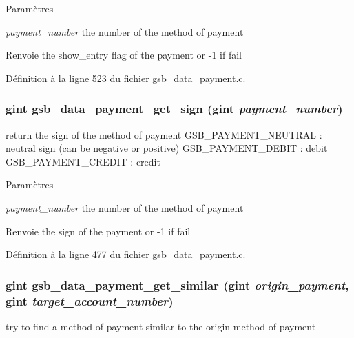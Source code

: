 \begin{DoxyParams}{Paramètres}
\item[{\em payment\_\-number}]the number of the method of payment\end{DoxyParams}
\begin{DoxyReturn}{Renvoie}
the show\_\-entry flag of the payment or -\/1 if fail 
\end{DoxyReturn}


Définition à la ligne 523 du fichier gsb\_\-data\_\-payment.c.

\subsubsection[{gsb\_\-data\_\-payment\_\-get\_\-sign}]{\setlength{\rightskip}{0pt plus 5cm}gint gsb\_\-data\_\-payment\_\-get\_\-sign (gint {\em payment\_\-number})}\label{gsb__data__payment_8h_a18c88a62c285b34be984f88c03dc2e70}
return the sign of the method of payment GSB\_\-PAYMENT\_\-NEUTRAL : neutral sign (can be negative or positive) GSB\_\-PAYMENT\_\-DEBIT : debit GSB\_\-PAYMENT\_\-CREDIT : credit


\begin{DoxyParams}{Paramètres}
\item[{\em payment\_\-number}]the number of the method of payment\end{DoxyParams}
\begin{DoxyReturn}{Renvoie}
the sign of the payment or -\/1 if fail 
\end{DoxyReturn}


Définition à la ligne 477 du fichier gsb\_\-data\_\-payment.c.

\subsubsection[{gsb\_\-data\_\-payment\_\-get\_\-similar}]{\setlength{\rightskip}{0pt plus 5cm}gint gsb\_\-data\_\-payment\_\-get\_\-similar (gint {\em origin\_\-payment}, \/  gint {\em target\_\-account\_\-number})}\label{gsb__data__payment_8h_abcd7cbec25fc03ab15e1faeda58ba32d}
try to find a method of payment similar to the origin method of payment


